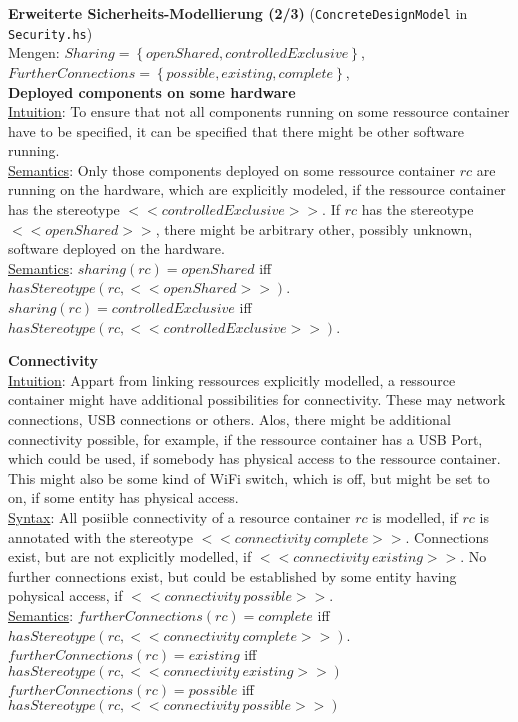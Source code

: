 \textbf{Erweiterte Sicherheits-Modellierung (2/3)} (\texttt{ConcreteDesignModel} in \texttt{Security.hs})\\

Mengen: $Sharing = \left\{openShared, controlledExclusive\right\}$, \\
        $FurtherConnections = \left\{possible, existing, complete \right\}$, \\


\textbf{Deployed components on some hardware}\\
\underline{Intuition}: To ensure that not all components running on some ressource container have to be specified, it can be specified that there might be other software running.\\
\underline{Semantics}: Only those components deployed on some ressource container $rc$ are running on the hardware, which are explicitly modeled, if the ressource container has the stereotype $<<controlledExclusive>>$.
If $rc$ has the stereotype $<<openShared>>$, there might be arbitrary other, possibly unknown, software deployed on the hardware. \\
\underline{Semantics}: $sharing(rc) = openShared$ iff $hasStereotype(rc, <<openShared>>)$.  $sharing(rc) = controlledExclusive$ iff $hasStereotype(rc, <<controlledExclusive>>)$.

\textbf{Connectivity} \\
\underline{Intuition}: Appart from linking ressources explicitly modelled, a ressource container might have additional possibilities for connectivity.
These may network connections, USB connections or others.
Alos, there might be additional connectivity possible, for example, if the ressource container has a USB Port, which could be used, if somebody has physical access to the ressource container.
This might also be some kind of WiFi switch, which is off, but might be set to on, if some entity has physical access.\\
\underline{Syntax}: All posiible connectivity of a resource container $rc$ is modelled, if $rc$ is annotated with the stereotype $<<connectivity~complete>>$.
Connections exist, but are not explicitly modelled, if $<<connectivity~existing>>$.
No further connections exist, but could be established by some entity having pohysical access, if $<<connectivity~possible>>$.\\
\underline{Semantics}: $furtherConnections(rc) = complete$ iff $hasStereotype(rc, <<connectivity~complete>>)$.\\
$furtherConnections(rc) = existing$ iff $hasStereotype(rc, <<connectivity~existing>>)$\\
$furtherConnections(rc) = possible$ iff $hasStereotype(rc, <<connectivity~possible>>)$\\
        

